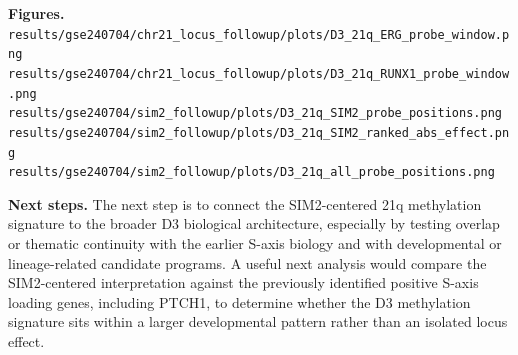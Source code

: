 \textbf{Figures.}
\texttt{results/gse240704/chr21\_locus\_followup/plots/D3\_21q\_ERG\_probe\_window.png}\\
\texttt{results/gse240704/chr21\_locus\_followup/plots/D3\_21q\_RUNX1\_probe\_window.png}\\
\texttt{results/gse240704/sim2\_followup/plots/D3\_21q\_SIM2\_probe\_positions.png}\\
\texttt{results/gse240704/sim2\_followup/plots/D3\_21q\_SIM2\_ranked\_abs\_effect.png}\\
\texttt{results/gse240704/sim2\_followup/plots/D3\_21q\_all\_probe\_positions.png}

\textbf{Next steps.}
The next step is to connect the SIM2-centered 21q methylation signature to the broader D3 biological architecture, especially by testing overlap or thematic continuity with the earlier S-axis biology and with developmental or lineage-related candidate programs. A useful next analysis would compare the SIM2-centered interpretation against the previously identified positive S-axis loading genes, including PTCH1, to determine whether the D3 methylation signature sits within a larger developmental pattern rather than an isolated locus effect.
